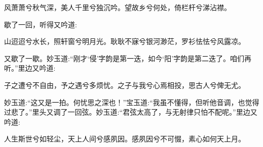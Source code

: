 \begin{poem}
    \begin{pl}
        风萧萧兮秋气深，美人千里兮独沉吟。望故乡兮何处，倚栏杆兮涕沾襟。
    \end{pl}
\end{poem}


\begin{parag}
    歇了一回，听得又吟道:
\end{parag}


\begin{poem}
    \begin{pl}
        山迢迢兮水长，照轩窗兮明月光。耿耿不寐兮银河渺茫，罗衫怯怯兮风露凉。
    \end{pl}
\end{poem}


\begin{parag}
    又歇了一歇。妙玉道:“刚才‘侵’字韵是第一迭，如今‘阳’字韵是第二迭了。咱们再听。”里边又吟道:
\end{parag}

\begin{poem}
    \begin{pl}
        子之遭兮不自由，予之遇兮多烦忧。之子与我兮心焉相投，思古人兮俾无尤。
    \end{pl}
\end{poem}


\begin{parag}
    妙玉道:“这又是一拍。何忧思之深也！”宝玉道:“我虽不懂得，但听他音调，也觉得过悲了。”里头又调了一回弦。妙玉道:“君弦太高了，与无射律只怕不配呢。”里边又吟道:
\end{parag}

\begin{poem}
    \begin{pl}
        人生斯世兮如轻尘，天上人间兮感夙因。感夙因兮不可惙，素心如何天上月。
    \end{pl}
\end{poem}


